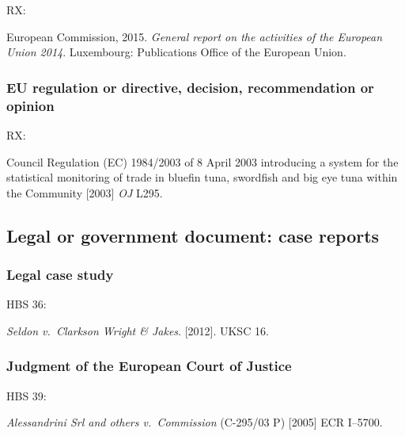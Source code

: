 RX: \cite{ec2015gra}

European Commission, 2015. \emph{General report on the activities of the European Union 2014}. Luxembourg: Publications Office of the European Union.




\subsubsection*{EU regulation or directive, decision, recommendation or opinion}

RX: \cite{eu.dir1984/2003}

Council Regulation (EC) 1984/2003 of 8 April 2003 introducing a system for the statistical monitoring of trade in bluefin tuna, swordfish and big eye tuna within the Community [2003] \emph{OJ} L295.



\subsection{Legal or government document: case reports}

\subsubsection*{Legal case study}

HBS 36: \cite{seldon-v-c.w.j2012}

\emph{Seldon v.~Clarkson Wright \& Jakes}. [2012]. UKSC 16.



\subsubsection*{Judgment of the European Court of Justice}

HBS 39: \cite{srl.etal-v-comm2005}

\emph{Alessandrini Srl and others v.~Commission} (C-295/03 P) [2005] ECR I--5700.


